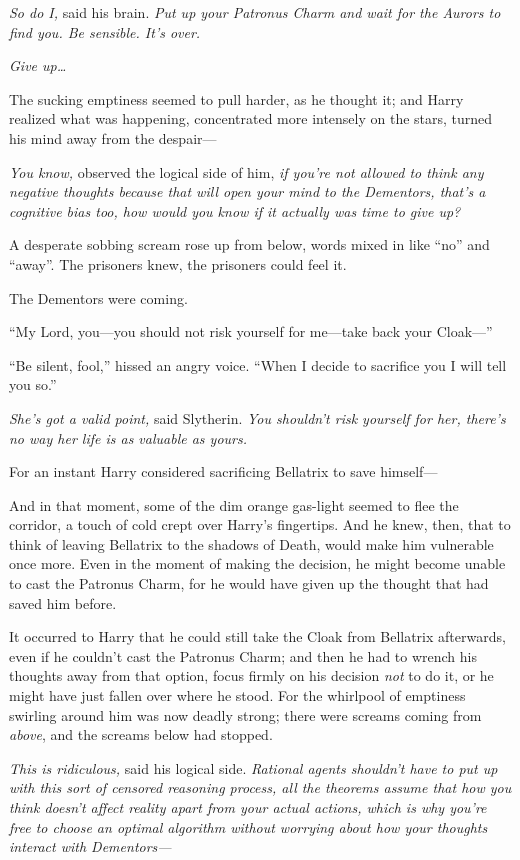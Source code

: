 \emph{So do I,} said his brain. \emph{Put up your Patronus Charm and wait for the Aurors to find you. Be sensible. It’s over.}

\emph{Give up…}

The sucking emptiness seemed to pull harder, as he thought it; and Harry realized what was happening, concentrated more intensely on the stars, turned his mind away from the despair—

\emph{You know,} observed the logical side of him, \emph{if you’re not allowed to think \emph{any} negative thoughts because that will open your mind to the Dementors, \emph{that’s} a cognitive bias too, how would you know if it actually \emph{was} time to give up?}

A desperate sobbing scream rose up from below, words mixed in like “no” and “away”. The prisoners knew, the prisoners could feel it.

The Dementors were coming.

“My Lord, you—you should not risk yourself for me—take back your Cloak—”

“Be silent, fool,” hissed an angry voice. “When I decide to sacrifice you I will tell you so.”

\emph{She’s got a valid point,} said Slytherin. \emph{You \emph{shouldn’t} risk yourself for her, there’s no way her life is as valuable as yours.}

For an instant Harry considered sacrificing Bellatrix to save himself—

And in that moment, some of the dim orange gas-light seemed to flee the corridor, a touch of cold crept over Harry’s fingertips. And he knew, then, that to think of leaving Bellatrix to the shadows of Death, would make him vulnerable once more. Even in the moment of making the decision, he might become unable to cast the Patronus Charm, for he would have given up the thought that had saved him before.

It occurred to Harry that he could still take the Cloak from Bellatrix afterwards, even if he couldn’t cast the Patronus Charm; and then he had to wrench his thoughts away from that option, focus firmly on his decision \emph{not} to do it, or he might have just fallen over where he stood. For the whirlpool of emptiness swirling around him was now deadly strong; there were screams coming from \emph{above}, and the screams below had stopped.

\emph{This is ridiculous,} said his logical side. \emph{Rational agents shouldn’t have to put up with this sort of censored reasoning process, all the theorems assume that how you think doesn’t affect reality apart from your actual actions, which is why you’re free to choose an optimal algorithm without worrying about how your thoughts interact with Dementors—}

